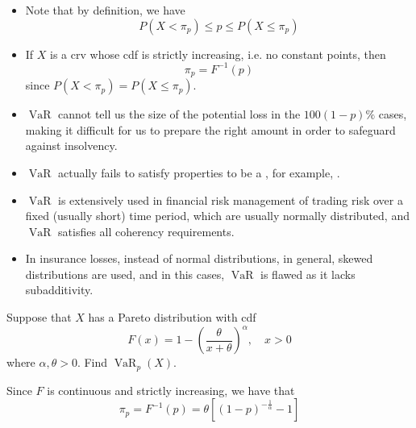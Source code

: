 \documentclass[notoc,notitlepage]{tufte-book}
\DeclareMathOperator{\VaR}{VaR}
\begin{document}
\begin{note}
  \begin{itemize}
    \item Note that by definition, we have
      \begin{equation*}
        P(X < \pi_p) \leq p \leq P(X \leq \pi_p)
      \end{equation*}
    \item If $X$ is a crv whose cdf is strictly increasing, i.e. no constant points, then
      \begin{equation*}
        \pi_p = F^{-1}(p)
      \end{equation*}
      since $P(X < \pi_p) = P(X \leq \pi_p)$.
  \end{itemize}
\end{note}

\begin{warning}[Shortcomings of $\VaR$]
  \begin{itemize}
    \item $\VaR$ cannot tell us the size of the potential loss in the $100(1 - p)\%$ cases, making it difficult for us to prepare the right amount in order to safeguard against insolvency.
    \item $\VaR$ actually fails to satisfy properties to be a , for example, .
    \item $\VaR$ is extensively used in financial risk management of trading risk over a fixed (usually short) time period, which are usually normally distributed, and $\VaR$ satisfies all coherency requirements.
    \item In insurance losses, instead of normal distributions, in general, skewed distributions are used, and in this cases, $\VaR$ is flawed as it lacks subadditivity.
  \end{itemize}
\end{warning}

\begin{eg}\label{eg:varp_pareto}
  Suppose that $X$ has a Pareto distribution with cdf
  \begin{equation*}
    F(x) = 1 - \left( \frac{\theta}{x + \theta} \right)^\alpha , \quad x > 0
  \end{equation*}
  where $\alpha, \theta > 0$. Find $\VaR_p(X)$.
\end{eg}

\begin{solution}
  Since $F$ is continuous and strictly increasing, we have that
  \begin{equation*}
    \pi_p = F^{-1}(p) = \theta \left[ (1 - p)^{-\frac{1}{\alpha}} - 1 \right]
  \end{equation*}
\end{solution}
\end{document}
